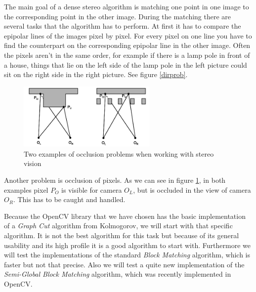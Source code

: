 \documentclass[a4paper]{article}
\begin{document}
The main goal of a dense stereo algorithm is matching one point in one
image to the corresponding point in the other image. During the
matching there are several tasks that the algorithm has to perform. At
first it has to compare the epipolar lines of the images pixel by
pixel. For every pixel on one line you have to find the counterpart on
the corresponding epipolar line in the other image. Often the pixels
aren't in the same order, for example if there is a lamp pole in front
of a house, things that lie on the left side of the lamp pole in the
left picture could sit on the right side in the right picture. See
figure \ref{dirprob}.

\begin{figure} [h!tb]
\centering
\includegraphics[width=0.6\textwidth]{matching_problems_occlusion}
\caption{Two examples of occlusion problems when working with stereo
vision}
\label{occprob} 
\end{figure}

Another problem is occlusion of pixels. As we can see in figure \ref{occprob},
in both examples pixel $P_O$ is visible for camera $O_L$, but is occluded in the
view of camera $O_R$. This has to be caught and handled. 

Because the OpenCV library that we have chosen has the basic
implementation of a \emph{Graph Cut} algorithm from
Kolmogorov\cite{kolmogorov2003}, we will start with that specific
algorithm. It is not the best algorithm for this task but because of
its general usability and its high profile it is a good algorithm to start
with. Furthermore we will test the implementations of the
standard \emph{Block Matching} algorithm, which is faster but not that
precise. Also we will test a quite new implementation of the
\emph{Semi-Global Block Matching} algorithm, which was recently implemented in OpenCV.
\end{document}

